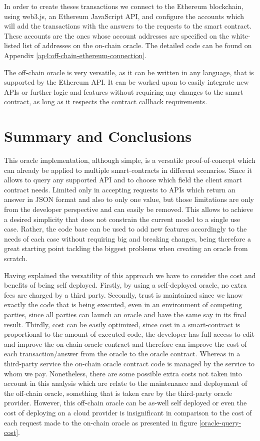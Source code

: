 In order to create theses transactions we connect to the Ethereum blockchain, using web3.js, an Ethereum JavaScript API, and configure the accounts which will add the transactions with the answers to the requests to the smart contract. These accounts are the ones whose account addresses are specified on the white-listed list of addresses on the on-chain oracle. The detailed code can be found on Appendix \ref{ap4:off-chain-ethereum-connection}.

The off-chain oracle is very versatile, as it can be written in any language, that is supported by the Ethereum API. It can be worked upon to easily integrate new APIs or further logic and features without requiring any changes to the smart contract, as long as it respects the contract callback requirements.

\section{Summary and Conclusions}

This oracle implementation, although simple, is a versatile proof-of-concept which can already be applied to multiple smart-contracts in different scenarios. Since it allows to query any supported API and to choose which field the client smart contract needs. Limited only in accepting requests to APIs which return an answer in JSON format and also to only one value, but those limitations are only from the developer perspective and can easily be removed. This allows to achieve a desired simplicity that does not constrain the current model to a single use case. Rather, the code base can be used to add new features accordingly to the needs of each case without requiring big and breaking changes, being therefore a great starting point tackling the biggest problems when creating an oracle from scratch.

Having explained the versatility of this approach we have to consider the cost and benefits of being self deployed. Firstly, by using a self-deployed oracle, no extra fees are charged by a third party. Secondly, trust is maintained since we know exactly the code that is being executed, even in an environment of competing parties, since all parties can launch an oracle and have the same say in its final result. Thirdly, cost can be easily optimized, since cost in a smart-contract is proportional to the amount of executed code, the developer has full access to edit and improve the on-chain oracle contract and therefore can improve the cost of each transaction/answer from the oracle to the oracle contract. Whereas in a third-party service the on-chain oracle contract code is managed by the service to whom we pay. Nonetheless, there are some possible extra costs not taken into account in this analysis which are relate to the maintenance and deployment of the off-chain oracle, something that is taken care by the third-party oracle provider. However, this off-chain oracle can be as-well self deployed or even the cost of deploying on a cloud provider is insignificant in comparison to the cost of each request made to the on-chain oracle as presented in figure \ref{oracle-query-cost}.

